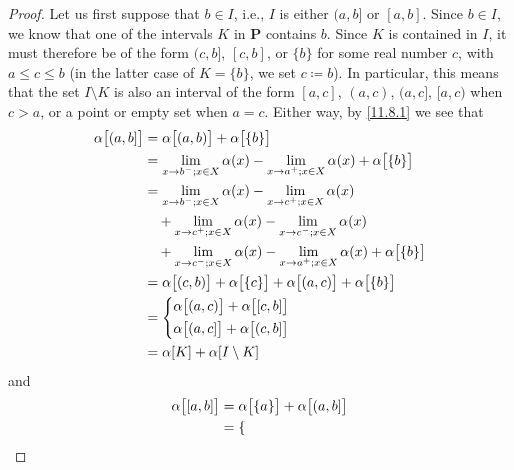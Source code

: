 \begin{proof}
      Let us first suppose that \(b \in I\), i.e., \(I\) is either \((a, b]\) or \([a, b]\).
  Since \(b \in I\), we know that one of the intervals \(K\) in \(\mathbf{P}\) contains \(b\).
  Since \(K\) is contained in \(I\), it must therefore be of the form \((c, b]\), \([c, b]\), or \(\{b\}\) for some real number \(c\), with \(a \leq c \leq b\) (in the latter case of \(K = \{b\}\), we set \(c \coloneqq b\)).
  In particular, this means that the set \(I \setminus K\) is also an interval of the form \([a, c]\), \((a, c)\), \((a, c]\), \([a, c)\) when \(c > a\), or a point or empty set when \(a = c\).
  Either way, by \cref{11.8.1} we see that
  \begin{align*}
    \alpha\big[(a, b]\big] & = \alpha\big[(a, b)\big] + \alpha\big[\{b\}\big]                                                            \\
                           & = \lim_{x \to b^- ; x \in X} \alpha(x) - \lim_{x \to a^+ ; x \in X} \alpha(x) + \alpha\big[\{b\}\big]       \\
                           & = \lim_{x \to b^- ; x \in X} \alpha(x) - \lim_{x \to c^+ ; x \in X} \alpha(x)                               \\
                           & \quad + \lim_{x \to c^+ ; x \in X} \alpha(x) - \lim_{x \to c^- ; x \in X} \alpha(x)                         \\
                           & \quad + \lim_{x \to c^- ; x \in X} \alpha(x) - \lim_{x \to a^+ ; x \in X} \alpha(x) + \alpha\big[\{b\}\big] \\
                           & = \alpha\big[(c, b)\big] + \alpha\big[\{c\}\big] + \alpha\big[(a, c)\big] + \alpha\big[\{b\}\big]           \\
                           & = \begin{dcases}
                                 \alpha\big[(a, c)\big] + \alpha\big[[c, b]\big] \\
                                 \alpha\big[(a, c]\big] + \alpha\big[(c, b]\big]
                               \end{dcases}                           \\
                           & = \alpha[K] + \alpha[I \setminus K]
  \end{align*}
  and
  \begin{align*}
    \alpha\big[[a, b]\big] & = \alpha\big[\{a\}\big] + \alpha\big[(a, b]\big]                                                          \\
                           & = \begin{dcases}

\end{dcases}
\end{align*}
\end{proof}
